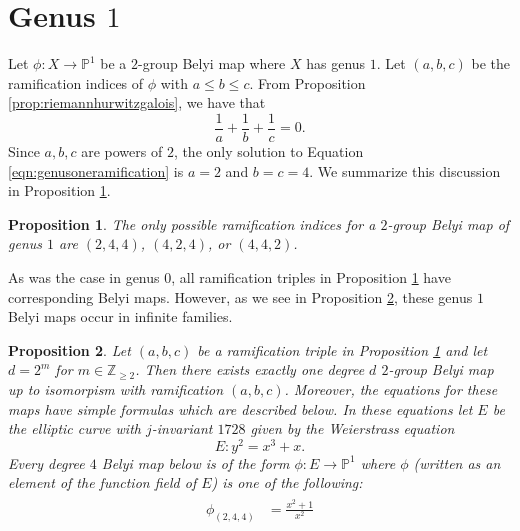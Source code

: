 \documentclass{dcthesis}
\newcommand{\PP}{\mathbb P}
\newcommand{\ZZ}{\mathbb Z}
\newtheorem{prop}{Proposition}[section]
\theoremstyle{definition}
\theoremstyle{remark}
\numberwithin{equation}{section}
\numberwithin{figure}{section}
\begin{document}
{  \section{Genus $1$}{\label{sec:genusone}
    Let $\phi\colon X\to\PP^1$ be a $2$-group Belyi map
    where $X$ has genus $1$.
    Let $(a,b,c)$ be the ramification indices of $\phi$
    with $a\leq b\leq c$.
    From Proposition \ref{prop:riemannhurwitzgalois},
    we have that
    \begin{equation}\label{eqn:genusoneramification}
      \frac{1}{a}+\frac{1}{b}+\frac{1}{c} = 0.
    \end{equation}
    Since $a,b,c$ are powers of $2$,
    the only solution to
    Equation \ref{eqn:genusoneramification}
    is $a=2$ and $b=c=4$.
    We summarize this discussion in
    Proposition \ref{prop:genusoneramification}.
    \begin{prop}\label{prop:genusoneramification}
      The only possible ramification indices for
      a $2$-group Belyi map of genus $1$
      are $(2,4,4)$, $(4,2,4)$, or $(4,4,2)$.
    \end{prop}
    As was the case in genus $0$,
    all ramification triples in
    Proposition \ref{prop:genusoneramification}
    have corresponding Belyi maps.
    However, as we see in
    Proposition \ref{prop:genusonemaps},
    these genus $1$ Belyi maps occur in infinite families.
    \begin{prop}\label{prop:genusonemaps}
      Let $(a,b,c)$ be a ramification triple in
      Proposition \ref{prop:genusoneramification}
      and let $d = 2^m$ for $m\in\ZZ_{\geq 2}$.
      Then there exists exactly one
      degree $d$ $2$-group Belyi map up to isomorpism
      with ramification $(a,b,c)$.
      Moreover, the equations for these maps have simple formulas
      which are described below.
      In these equations let $E$ be the elliptic curve
      with $j$-invariant $1728$ given by the Weierstrass equation
      \[
        E\colon y^2 = x^3+x.
      \]
      Every degree $4$ Belyi map below is of the form
      $\phi\colon E\to\PP^1$ where $\phi$
      (written as an element of the function field of $E$)
      is one of the following:
      \begin{align}\label{eqn:d4g1}
        \begin{split}
          \phi_{(2,4,4)} &= \frac{x^2+1}{x^2}\\

\end{split}
\end{align}
\end{prop}}}
\end{document}
